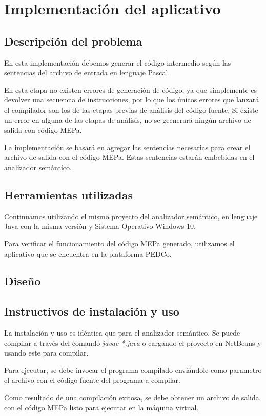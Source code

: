 \section{Implementación del aplicativo}

\subsection{Descripción del problema}
En esta implementación debemos generar el código intermedio según las sentencias del archivo de entrada en lenguaje Pascal. 

En esta etapa no existen errores de generación de código, ya que simplemente es devolver una secuencia de instrucciones, por lo que los únicos errores que lanzará el compilador son los de las etapas previas de análisis del código fuente. Si existe un error en alguna de las etapas de análisis, no se geenerará ningún archivo de salida con código MEPa.

La implementación se basará en agregar las sentencias necesarias para crear el archivo de salida con el código MEPa. Estas sentencias estarán embebidas en el analizador semántico.

\subsection{Herramientas utilizadas}
Continuamos utilizando el mismo proyecto del analizador semántico, en lenguaje Java con la misma versión y Sistema Operativo Windows 10.

Para verificar el funcionamiento del código MEPa generado, utilizamos el aplicativo que se encuentra en la plataforma PEDCo.

\subsection{Diseño}

\subsection{Instructivos de instalación y uso}
La instalación y uso es idéntica que para el analizador semántico. Se puede compilar a través del comando \emph{javac *.java} o cargando el proyecto en NetBeans y usando este para compilar.

Para ejecutar, se debe invocar el programa compilado enviándole como parametro el archivo con el código fuente del programa a compilar. 

Como resultado de una compilación exitosa, se debe obtener un archivo de salida con el código MEPa listo para ejecutar en la máquina virtual.

